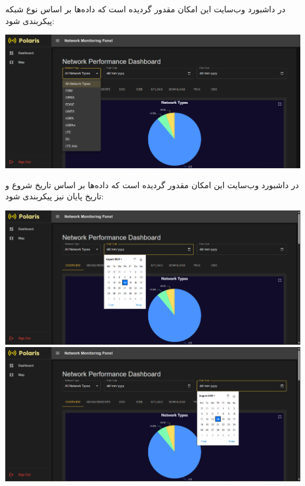 \begin{itemize}
\begin{center}
			\end{center}	   		
		در داشبورد وب‌سایت این امکان مقدور گردیده است که داده‌ها بر اساس نوع شبکه پیکربندی شود:
			\begin{center}
				\includegraphics[width=\textwidth]{images/fr-filters-network.png}
			\end{center}	   		
   		در داشبورد وب‌سایت این امکان مقدور گردیده است که داده‌ها بر اساس تاریخ شروع و تاریخ پایان نیز پیکربندی شود:
	   		\begin{center}
	   			\includegraphics[width=\textwidth]{images/fr-filters-start-date.png}
	   			\includegraphics[width=\textwidth]{images/fr-filters-end-date.png}
	   		\end{center}
   		

\end{itemize}
